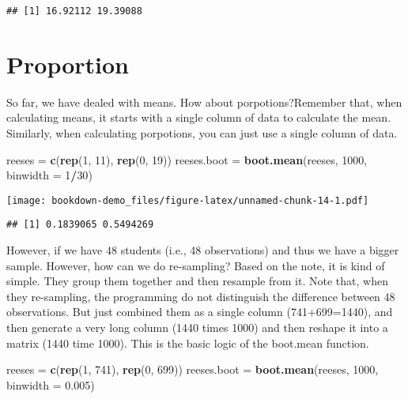 \documentclass[]{book}
\newenvironment{Shaded}{\begin{snugshade}}{\end{snugshade}}
\newcommand{\DataTypeTok}[1]{\textcolor[rgb]{0.13,0.29,0.53}{#1}}
\newcommand{\DecValTok}[1]{\textcolor[rgb]{0.00,0.00,0.81}{#1}}
\newcommand{\FloatTok}[1]{\textcolor[rgb]{0.00,0.00,0.81}{#1}}
\newcommand{\KeywordTok}[1]{\textcolor[rgb]{0.13,0.29,0.53}{\textbf{#1}}}
\newcommand{\NormalTok}[1]{#1}
\newcommand{\OperatorTok}[1]{\textcolor[rgb]{0.81,0.36,0.00}{\textbf{#1}}}
\newcommand{\StringTok}[1]{\textcolor[rgb]{0.31,0.60,0.02}{#1}}
\begin{document}
\begin{verbatim}
## [1] 16.92112 19.39088
\end{verbatim}

\hypertarget{proportion}{%
\section{Proportion}\label{proportion}}

So far, we have dealed with means. How about porpotions?Remember that, when calculating means, it starts with a single column of data to calculate the mean. Similarly, when calculating porpotions, you can just use a single column of data.

\begin{Shaded}
\begin{Highlighting}[]
\NormalTok{reeses =}\StringTok{ }\KeywordTok{c}\NormalTok{(}\KeywordTok{rep}\NormalTok{(}\DecValTok{1}\NormalTok{, }\DecValTok{11}\NormalTok{), }\KeywordTok{rep}\NormalTok{(}\DecValTok{0}\NormalTok{, }\DecValTok{19}\NormalTok{))}
\NormalTok{reeses.boot =}\StringTok{ }\KeywordTok{boot.mean}\NormalTok{(reeses, }\DecValTok{1000}\NormalTok{, }\DataTypeTok{binwidth =} \DecValTok{1}\OperatorTok{/}\DecValTok{30}\NormalTok{)}
\end{Highlighting}
\end{Shaded}

\texttt{[image: bookdown-demo\_files/figure-latex/unnamed-chunk-14-1.pdf]}

\begin{verbatim}
## [1] 0.1839065 0.5494269
\end{verbatim}

However, if we have 48 students (i.e., 48 observations) and thus we have a bigger sample. However, how can we do re-sampling? Based on the note, it is kind of simple. They group them together and then resample from it. Note that, when they re-sampling, the programming do not distinguish the difference between 48 observations. But just combined them as a single column (741+699=1440), and then generate a very long column (1440 times 1000) and then reshape it into a matrix (1440 time 1000). This is the basic logic of the boot.mean function.

\begin{Shaded}
\begin{Highlighting}[]
\NormalTok{reeses =}\StringTok{ }\KeywordTok{c}\NormalTok{(}\KeywordTok{rep}\NormalTok{(}\DecValTok{1}\NormalTok{, }\DecValTok{741}\NormalTok{), }\KeywordTok{rep}\NormalTok{(}\DecValTok{0}\NormalTok{, }\DecValTok{699}\NormalTok{))}
\NormalTok{reeses.boot =}\StringTok{ }\KeywordTok{boot.mean}\NormalTok{(reeses, }\DecValTok{1000}\NormalTok{, }\DataTypeTok{binwidth =} \FloatTok{0.005}\NormalTok{)}
\end{Highlighting}
\end{Shaded}
\end{document}
